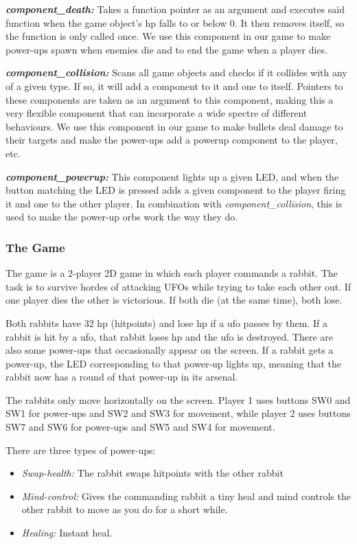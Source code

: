 \documentclass[a4paper,12pt]{article}
\begin{document}
\textbf{\emph{component\_death:}} Takes a function pointer as an argument and executes said function when the game object’s hp falls to or below 0. It then removes itself, so the function is only called once. We use this component in our game to make power-ups spawn when enemies die and to end the game when a player dies.

\textbf{\emph{component\_collision:}} Scans all game objects and checks if it collides with any of a given type. If so, it will add a component to it and one to itself. Pointers to these components are taken as an argument to this component, making this a very flexible component that can incorporate a wide spectre of different behaviours. We use this component in our game to make bullets deal damage to their targets and make the power-ups add a powerup component to the player, etc.

\textbf{\emph{component\_powerup:}} This component lights up a given LED, and when the button matching the LED is pressed adds a given component to the player firing it and one to the other player. In combination with \emph{component\_collision}, this is used to make the power-up orbs work the way they do.

\subsubsection{The Game} %

The game is a 2-player 2D game in which each player commands a rabbit. The task is to survive hordes of attacking UFOs while trying to take each other out. If one player dies the other is victorious. If both die (at the same time), both lose.

Both rabbits have 32 hp (hitpoints) and lose hp if a ufo passes by them. If a rabbit is hit by a ufo, that rabbit loses hp and the ufo is destroyed. There are also some power-ups that occasionally appear on the screen. If a rabbit gets a power-up, the LED corresponding to that power-up lights up, meaning that the rabbit now has a round of that power-up in its arsenal.

The rabbits only move horizontally on the screen. Player 1 uses buttons SW0 and SW1 for power-ups and SW2 and SW3 for movement, while player 2 uses buttons SW7 and SW6 for power-ups and SW5 and SW4 for movement.

There are three types of power-ups:
\begin{itemize}
\item \emph{Swap-health:} The rabbit swaps hitpoints with the other rabbit
\item \emph{Mind-control:} Gives the commanding rabbit a tiny heal and mind controls the other rabbit to move as you do for a short while.
\item \emph{Healing:} Instant heal.  
\end{itemize}
\end{document}
